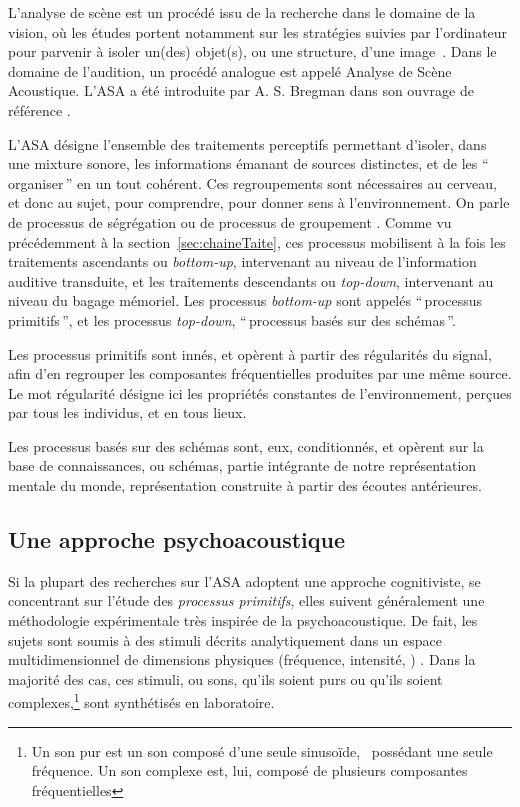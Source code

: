 L'analyse de scène est un procédé issu de la recherche dans le domaine de la vision, où les études portent notamment sur les stratégies suivies par l'ordinateur pour parvenir à isoler un(des) objet(s), ou une structure, d'une image~\citep[p. 12]{mcadams1994penser}. Dans le domaine de l'audition, un procédé analogue est appelé Analyse de Scène Acoustique. L'ASA a été introduite par A. S. Bregman dans son ouvrage de référence \citep{bregman1994auditory}.

L'ASA désigne l'ensemble des traitements perceptifs permettant d'isoler, dans une mixture sonore, les informations émanant de sources distinctes, et de les ``\,organiser\,'' en un tout cohérent. Ces regroupements sont nécessaires au cerveau, et donc au sujet, pour comprendre, pour donner sens à l'environnement. On parle de processus de ségrégation ou de processus de groupement \citep{winkler2009modeling}. Comme vu précédemment à la section~\ref{sec:chaineTaite}, ces processus mobilisent à la fois les traitements ascendants ou \emph{bottom-up}, intervenant au niveau de l'information auditive transduite, et les traitements descendants ou \emph{top-down}, intervenant au niveau du bagage mémoriel. Les processus \emph{bottom-up} sont appelés ``\,processus primitifs\,'', et les processus  \emph{top-down}, ``\,processus basés sur des schémas\,''. 

Les processus primitifs sont innés, et opèrent à partir des régularités du signal, afin d'en regrouper les composantes fréquentielles produites par une même source. Le mot régularité désigne ici les propriétés constantes de l'environnement, perçues par tous les individus, et en tous lieux.

Les processus basés sur des schémas sont, eux, conditionnés, et opèrent sur la base de connaissances, ou schémas, partie intégrante de notre représentation mentale du monde, représentation construite à partir des écoutes antérieures. 
 
\subsection{Une approche psychoacoustique}

Si la plupart des recherches sur l'ASA adoptent une approche cognitiviste, se concentrant sur l'étude des \emph{processus primitifs}, elles suivent généralement une méthodologie expérimentale très inspirée de la psychoacoustique. De fait, les sujets sont soumis à des stimuli décrits analytiquement dans un espace multidimensionnel de dimensions physiques (fréquence, intensité, \etc) \citep{dubois2006cognitive}. Dans la majorité des cas, ces stimuli, ou sons, qu'ils soient purs ou qu'ils soient complexes,\footnote{Un son pur est un son composé d'une seule sinusoïde, \ie~possédant une seule fréquence. Un son complexe est, lui, composé de plusieurs composantes fréquentielles} sont synthétisés en laboratoire.


